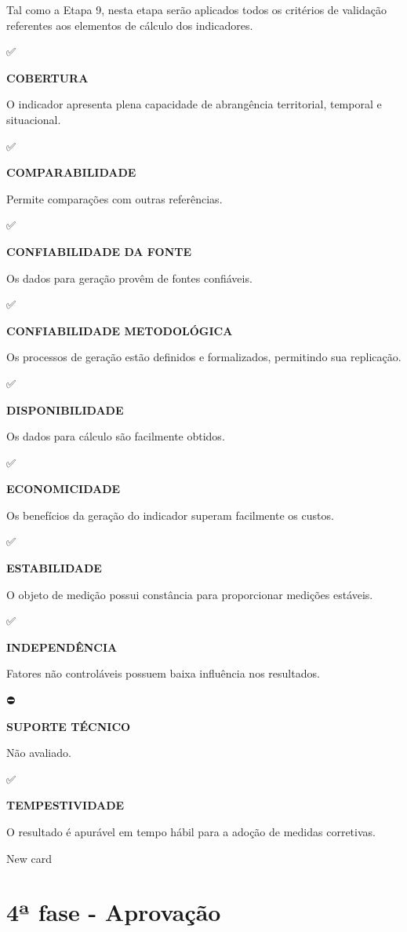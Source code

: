 \documentclass[
  letterpaper,
  DIV=11,
  numbers=noendperiod]{scrreprt}
\begin{document}
Tal como a Etapa 9, nesta etapa serão aplicados todos os critérios de
validação referentes aos elementos de cálculo dos indicadores.

✅

\textbf{COBERTURA}

O indicador apresenta plena capacidade de abrangência territorial,
temporal e situacional.

✅

\textbf{COMPARABILIDADE}

Permite comparações com outras referências.

✅

\textbf{CONFIABILIDADE DA FONTE}

Os dados para geração provêm de fontes confiáveis.

✅

\textbf{CONFIABILIDADE METODOLÓGICA}

Os processos de geração estão definidos e formalizados, permitindo sua
replicação.

✅

\textbf{DISPONIBILIDADE}

Os dados para cálculo são facilmente obtidos.

✅

\textbf{ECONOMICIDADE}

Os benefícios da geração do indicador superam facilmente os custos.

✅

\textbf{ESTABILIDADE}

O objeto de medição possui constância para proporcionar medições
estáveis.

✅

\textbf{INDEPENDÊNCIA}

Fatores não controláveis possuem baixa influência nos resultados.

⛔

\textbf{SUPORTE TÉCNICO}

Não avaliado.

✅

\textbf{TEMPESTIVIDADE}

O resultado é apurável em tempo hábil para a adoção de medidas
corretivas.

New card

\hypertarget{uxaa-fase---aprovauxe7uxe3o-1}{%
\section{4ª fase - Aprovação}\label{uxaa-fase---aprovauxe7uxe3o-1}}
\end{document}
